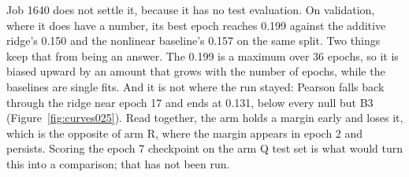 Job 1640 does not settle it, because it has no test evaluation. On validation,
where it does have a number, its best epoch reaches 0.199 against the additive
ridge's 0.150 and the nonlinear baseline's 0.157 on the same split. Two things
keep that from being an answer. The 0.199 is a maximum over 36 epochs, so it is
biased upward by an amount that grows with the number of epochs, while the
baselines are single fits. And it is not where the run stayed: Pearson falls back
through the ridge near epoch 17 and ends at 0.131, below every null but B3
(Figure~\ref{fig:curves025}). Read together, the arm holds a margin early and
loses it, which is the opposite of arm R, where the margin appears in epoch 2 and
persists. Scoring the epoch 7 checkpoint on the arm Q test set is what would turn
this into a comparison; that has not been run.
